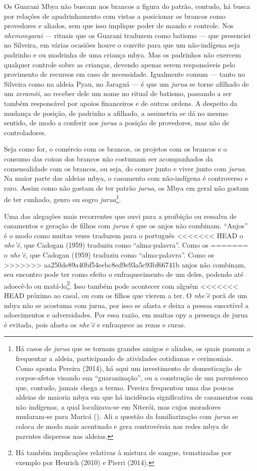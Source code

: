 {Os Guarani Mbya não buscam nos brancos a figura do patrão, contudo, há
busca por relações de apadrinhamento com vistas a posicionar os brancos
como provedores e aliados, sem que isso implique poder de mando e
controle. Nos \emph{nhemongarai} --- rituais que os Guarani traduzem como
batismo --- que presenciei no Silveira, em várias ocasiões houve o
convite para que um não-indígena seja padrinho e ou madrinha de uma
criança mbya. Mas os padrinhos não exercem qualquer controle sobre as
crianças, devendo apenas serem responsáveis pelo provimento de recursos
em caso de necessidade. Igualmente comum --- tanto no Silveira como na
aldeia Pyau, no Jaraguá --- é que um \emph{jurua} se torne afilhado de um
\emph{xeramõi}, ao receber dele um nome no ritual de batismo, passando a ser
também responsável por apoios financeiros e de outras ordens. A
despeito da mudança de posição, de padrinho a afilhado, a assimetria se
dá no mesmo sentido, de modo a conferir aos \emph{jurua} a posição de
provedores, mas não de controladores.

Seja como for, o comércio com os brancos, os projetos com os brancos e o
consumo das coisas dos brancos não costumam ser acompanhados da
comensalidade com os brancos, ou seja, do comer junto e viver junto com
\emph{jurua}. Na maior parte das aldeias mbya, o casamento com não-indígena é
controverso e raro. Assim como não gostam de ter patrão \emph{jurua}, os Mbya
em geral não gostam de ter cunhado, genro ou sogro \emph{jurua}\footnote{Há
casos de \emph{jurua} que se tornam grandes amigos e aliados, os quais passam
a frequentar a aldeia, participando de atividades cotidianas e
cerimoniais. Como aponta Pereira (2014), há aqui um investimento de
domesticação de corpos-afetos visando sua ``guaranização'', ou a
construção de um parentesco que, contudo, jamais chega a termo. Pereira
frequentou uma das poucas aldeias de maioria mbya em que há incidência
significativa de casamentos com não indígenas, a qual localizava-se em
Niterói, mas cujos moradores mudaram-se para Maricá (). Ali a questão
da familiarização com \emph{jurua} se coloca de modo mais acentuado e gera
controvérsia nas redes mbya de parentes dispersos nas aldeias.}. 

Uma das alegações mais recorrentes que ouvi para a proibição ou ressalva
de casamentos e geração de filhos com \emph{jurua} é que os anjos não
combinam. ``Anjos'' é o modo como muitas vezes traduzem para o português
<<<<<<< HEAD
o \emph{nhe’ẽ}, que Cadogan (1959) traduziu como ``alma-palavra''. Como os
=======
o \emph{nhe’\~{e}}, que Cadogan (1959) traduziu como ``alma-palavra''. Como os
>>>>>>> aa250de89a40bf54eebc8ed9e93a5c93bf66741b
anjos não combinam, seu encontro pode ter como efeito o enfraquecimento
de um deles, podendo até adoecê-lo ou matá-lo\footnote{Há também
implicações relativas à mistura de sangue, tematizadas por exemplo por
Heurich (2010) e Pierri (2014).}. Isso também pode acontecer com alguém
<<<<<<< HEAD
próximo ao casal, ou com os filhos que vierem a ter. O \emph{nhe’ẽ} porã
de um mbya não se acostuma com jurua, por isso se afasta e deixa a
pessoa suscetível a adoecimentos e adversidades. Por essa razão, em
muitas opy a presença de jurua é evitada, pois afasta os \emph{nhe’ẽ} e
enfraquece as rezas e curas.

}
